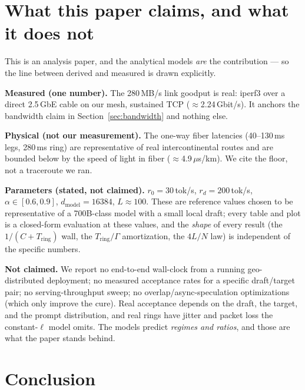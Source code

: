 \documentclass[11pt]{article}
\newcommand{\Tring}{\ensuremath{T_{\mathrm{ring}}}}
\newcommand{\dmodel}{\ensuremath{d_{\mathrm{model}}}}
\newcommand{\Gam}{\ensuremath{\Gamma}}
\begin{document}
\section{What this paper claims, and what it does not}
\label{sec:honesty}

This is an analysis paper, and the analytical models \emph{are} the contribution --- so the line
between derived and measured is drawn explicitly.

\textbf{Measured (one number).} The 280\,MB/s link goodput is real: iperf3 over a direct 2.5\,GbE
cable on our mesh, sustained TCP ($\approx$2.24\,Gbit/s). It anchors the bandwidth claim in
Section~\ref{sec:bandwidth} and nothing else.

\textbf{Physical (not our measurement).} The one-way fiber latencies (40--130\,ms legs, 280\,ms
ring) are representative of real intercontinental routes and are bounded below by the speed of light
in fiber ($\approx$4.9\,$\mu$s/km). We cite the floor, not a traceroute we ran.

\textbf{Parameters (stated, not claimed).} $r_0=30$\,tok/s, $r_d=200$\,tok/s, $\alpha\in[0.6,0.9]$,
$\dmodel=16384$, $L\approx100$. These are reference values chosen to be representative of a
700B-class model with a small local draft; every table and plot is a closed-form evaluation at these
values, and the \emph{shape} of every result (the $1/(C+\Tring)$ wall, the $\Tring/\Gam$
amortization, the $4L/N$ law) is independent of the specific numbers.

\textbf{Not claimed.} We report no end-to-end wall-clock from a running geo-distributed deployment;
no measured acceptance rates for a specific draft/target pair; no serving-throughput sweep; no
overlap/async-speculation optimizations (which only improve the cure). Real acceptance depends on
the draft, the target, and the prompt distribution, and real rings have jitter and packet loss the
constant-$\ell$ model omits. The models predict \emph{regimes and ratios}, and those are what the
paper stands behind.

\section{Conclusion}
\label{sec:conclusion}
\end{document}
